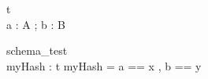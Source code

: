 \begin{schema}{t}\\
a : A ;
b : B
\end{schema}

\begin{schema}{schema\_test}\\
 myHash : t
\where
 myHash = \lblot a == x , b == y \rblot
\end{schema}
